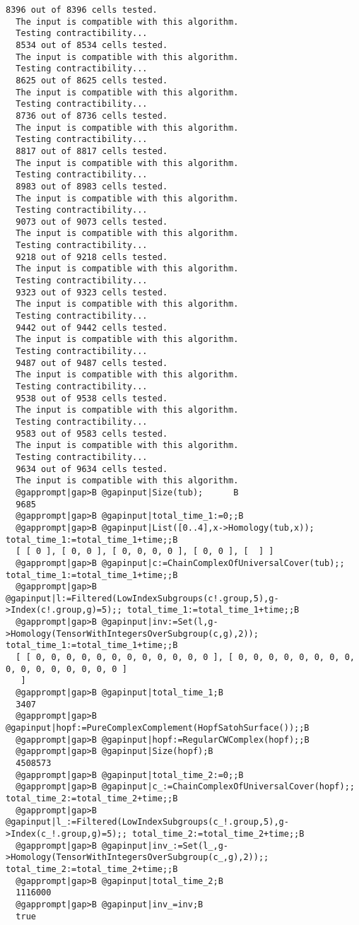 \documentclass[a4paper,11pt]{report}
\begin{document}
{{\begin{Verbatim}[commandchars=@|B,fontsize=\small,frame=single,label=Example]
  8396 out of 8396 cells tested.
  The input is compatible with this algorithm.
  Testing contractibility...
  8534 out of 8534 cells tested.
  The input is compatible with this algorithm.
  Testing contractibility...
  8625 out of 8625 cells tested.
  The input is compatible with this algorithm.
  Testing contractibility...
  8736 out of 8736 cells tested.
  The input is compatible with this algorithm.
  Testing contractibility...
  8817 out of 8817 cells tested.
  The input is compatible with this algorithm.
  Testing contractibility...
  8983 out of 8983 cells tested.
  The input is compatible with this algorithm.
  Testing contractibility...
  9073 out of 9073 cells tested.
  The input is compatible with this algorithm.
  Testing contractibility...
  9218 out of 9218 cells tested.
  The input is compatible with this algorithm.
  Testing contractibility...
  9323 out of 9323 cells tested.
  The input is compatible with this algorithm.
  Testing contractibility...
  9442 out of 9442 cells tested.
  The input is compatible with this algorithm.
  Testing contractibility...
  9487 out of 9487 cells tested.
  The input is compatible with this algorithm.
  Testing contractibility...
  9538 out of 9538 cells tested.
  The input is compatible with this algorithm.
  Testing contractibility...
  9583 out of 9583 cells tested.
  The input is compatible with this algorithm.
  Testing contractibility...
  9634 out of 9634 cells tested.
  The input is compatible with this algorithm.
  @gapprompt|gap>B @gapinput|Size(tub);      B
  9685
  @gapprompt|gap>B @gapinput|total_time_1:=0;;B
  @gapprompt|gap>B @gapinput|List([0..4],x->Homology(tub,x)); total_time_1:=total_time_1+time;;B
  [ [ 0 ], [ 0, 0 ], [ 0, 0, 0, 0 ], [ 0, 0 ], [  ] ]
  @gapprompt|gap>B @gapinput|c:=ChainComplexOfUniversalCover(tub);; total_time_1:=total_time_1+time;;B
  @gapprompt|gap>B @gapinput|l:=Filtered(LowIndexSubgroups(c!.group,5),g->Index(c!.group,g)=5);; total_time_1:=total_time_1+time;;B
  @gapprompt|gap>B @gapinput|inv:=Set(l,g->Homology(TensorWithIntegersOverSubgroup(c,g),2)); total_time_1:=total_time_1+time;;B
  [ [ 0, 0, 0, 0, 0, 0, 0, 0, 0, 0, 0, 0 ], [ 0, 0, 0, 0, 0, 0, 0, 0, 0, 0, 0, 0, 0, 0, 0, 0 ] 
   ]
  @gapprompt|gap>B @gapinput|total_time_1;B
  3407
  @gapprompt|gap>B @gapinput|hopf:=PureComplexComplement(HopfSatohSurface());;B
  @gapprompt|gap>B @gapinput|hopf:=RegularCWComplex(hopf);;B
  @gapprompt|gap>B @gapinput|Size(hopf);B
  4508573
  @gapprompt|gap>B @gapinput|total_time_2:=0;;B
  @gapprompt|gap>B @gapinput|c_:=ChainComplexOfUniversalCover(hopf);; total_time_2:=total_time_2+time;;B
  @gapprompt|gap>B @gapinput|l_:=Filtered(LowIndexSubgroups(c_!.group,5),g->Index(c_!.group,g)=5);; total_time_2:=total_time_2+time;;B
  @gapprompt|gap>B @gapinput|inv_:=Set(l_,g->Homology(TensorWithIntegersOverSubgroup(c_,g),2));; total_time_2:=total_time_2+time;;B
  @gapprompt|gap>B @gapinput|total_time_2;B
  1116000
  @gapprompt|gap>B @gapinput|inv_=inv;B
  true
  
\end{Verbatim}
 }

 }
\end{document}
